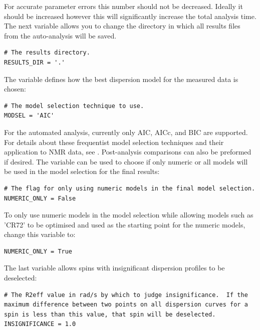 For accurate parameter errors this number should not be decreased.
Ideally it should be increased however this will significantly increase the total analysis time.
The next variable allows you to change the directory in which all results files from the auto-analysis will be saved.

\begin{lstlisting}[firstnumber=23]
# The results directory.
RESULTS_DIR = '.'
\end{lstlisting}

The  variable defines how the best dispersion model for the measured data is chosen:

\begin{lstlisting}[firstnumber=26]
# The model selection technique to use.
MODSEL = 'AIC'
\end{lstlisting}

For the automated analysis, currently only AIC, AICc, and BIC are supported.  For details about these frequentist model selection techniques and their application to NMR data, see \citet{dAuvergneGooley03}.  Post-analysis comparisons can also be preformed if desired.
The  variable can be used to choose if only numeric or all models will be used in the model selection for the final results:

\begin{lstlisting}[firstnumber=29]
# The flag for only using numeric models in the final model selection.
NUMERIC_ONLY = False
\end{lstlisting}

To only use numeric models in the model selection while allowing models such as 'CR72' to be optimised and used as the starting point for the numeric models, change this variable to:

\begin{lstlisting}[numbers=none]
NUMERIC_ONLY = True
\end{lstlisting}

The last variable allows spins with insignificant dispersion profiles to be deselected:

\begin{lstlisting}[firstnumber=32]
# The R2eff value in rad/s by which to judge insignificance.  If the maximum difference between two points on all dispersion curves for a spin is less than this value, that spin will be deselected.
INSIGNIFICANCE = 1.0
\end{lstlisting}

